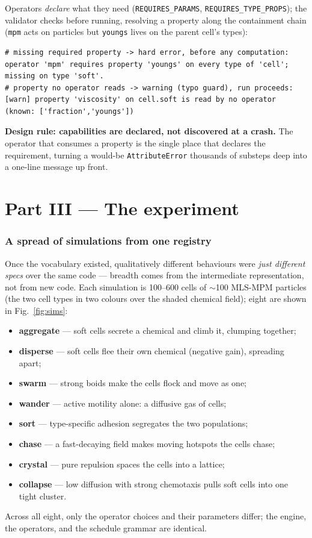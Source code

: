 \documentclass[11pt]{article}
\newcommand{\code}[1]{\texttt{#1}}
\begin{document}
Operators \emph{declare} what they need (\code{REQUIRES\_PARAMS},
\code{REQUIRES\_TYPE\_PROPS}); the validator checks before running, resolving a
property along the containment chain (\code{mpm} acts on particles but
\code{youngs} lives on the parent cell's types):
\begin{lstlisting}[style=yaml]
# missing required property -> hard error, before any computation:
operator 'mpm' requires property 'youngs' on every type of 'cell'; missing on type 'soft'.
# property no operator reads -> warning (typo guard), run proceeds:
[warn] property 'viscosity' on cell.soft is read by no operator (known: ['fraction','youngs'])
\end{lstlisting}
\textbf{Design rule: capabilities are declared, not discovered at a crash.} The
operator that consumes a property is the single place that declares the
requirement, turning a would-be \code{AttributeError} thousands of substeps deep
into a one-line message up front.

\part*{Part III --- The experiment}

\section{A spread of simulations from one registry}

Once the vocabulary existed, qualitatively different behaviours were \emph{just
different specs} over the same code --- breadth comes from the intermediate
representation, not from new code. Each simulation is 100--600 cells of $\sim$100
MLS-MPM particles (the two cell types in two colours over the shaded chemical
field); eight are shown in Fig.~\ref{fig:sims}:
\begin{itemize}\itemsep1pt
\item \textbf{aggregate} --- soft cells secrete a chemical and climb it, clumping together;
\item \textbf{disperse} --- soft cells flee their own chemical (negative gain), spreading apart;
\item \textbf{swarm} --- strong boids make the cells flock and move as one;
\item \textbf{wander} --- active motility alone: a diffusive gas of cells;
\item \textbf{sort} --- type-specific adhesion segregates the two populations;
\item \textbf{chase} --- a fast-decaying field makes moving hotspots the cells chase;
\item \textbf{crystal} --- pure repulsion spaces the cells into a lattice;
\item \textbf{collapse} --- low diffusion with strong chemotaxis pulls soft cells into one tight cluster.
\end{itemize}
Across all eight, only the operator choices and their parameters differ; the engine,
the operators, and the schedule grammar are identical.
\end{document}

